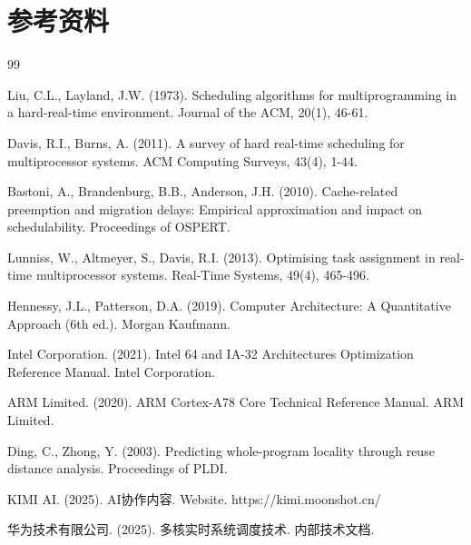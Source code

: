 
\section{参考资料} \label{sec:refs}

\begin{thebibliography}{99}

Liu, C.L., Layland, J.W. (1973). Scheduling algorithms for multiprogramming in a hard-real-time environment. Journal of the ACM, 20(1), 46-61.

Davis, R.I., Burns, A. (2011). A survey of hard real-time scheduling for multiprocessor systems. ACM Computing Surveys, 43(4), 1-44.

Bastoni, A., Brandenburg, B.B., Anderson, J.H. (2010). Cache-related preemption and migration delays: Empirical approximation and impact on schedulability. Proceedings of OSPERT.

Lunniss, W., Altmeyer, S., Davis, R.I. (2013). Optimising task assignment in real-time multiprocessor systems. Real-Time Systems, 49(4), 465-496.

Hennessy, J.L., Patterson, D.A. (2019). Computer Architecture: A Quantitative Approach (6th ed.). Morgan Kaufmann.

Intel Corporation. (2021). Intel 64 and IA-32 Architectures Optimization Reference Manual. Intel Corporation.

ARM Limited. (2020). ARM Cortex-A78 Core Technical Reference Manual. ARM Limited.

Ding, C., Zhong, Y. (2003). Predicting whole-program locality through reuse distance analysis. Proceedings of PLDI.

KIMI AI. (2025). AI协作内容. Website. https://kimi.moonshot.cn/

华为技术有限公司. (2025). 多核实时系统调度技术. 内部技术文档.

\end{thebibliography}
